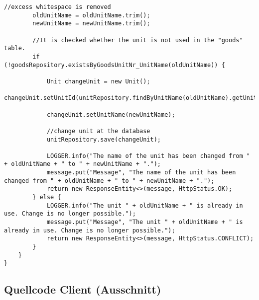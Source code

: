 \begin{lstlisting}[frame=tb, caption={Das Listing zeigt die Klasse UnitController im Paket controller}, label={lst:UnitController}]
		//excess whitespace is removed
		oldUnitName = oldUnitName.trim();
		newUnitName = newUnitName.trim();
		
		//It is checked whether the unit is not used in the "goods" table.
		if (!goodsRepository.existsByGoodsUnitNr_UnitName(oldUnitName)) {
			
			Unit changeUnit = new Unit();
			changeUnit.setUnitId(unitRepository.findByUnitName(oldUnitName).getUnitId());
			
			changeUnit.setUnitName(newUnitName);
			
			//change unit at the database
			unitRepository.save(changeUnit);
			
			LOGGER.info("The name of the unit has been changed from " + oldUnitName + " to " + newUnitName + ".");
			message.put("Message", "The name of the unit has been changed from " + oldUnitName + " to " + newUnitName + ".");
			return new ResponseEntity<>(message, HttpStatus.OK);
		} else {
			LOGGER.info("The unit " + oldUnitName + " is already in use. Change is no longer possible.");
			message.put("Message", "The unit " + oldUnitName + " is already in use. Change is no longer possible.");
			return new ResponseEntity<>(message, HttpStatus.CONFLICT);
		}
	}
}
\end{lstlisting}













\subsection *{Quellcode Client (Ausschnitt)}\label{QuellcodeClient}

